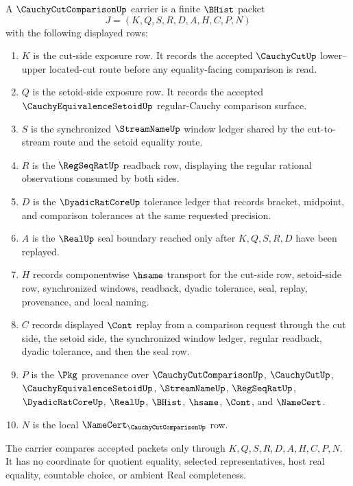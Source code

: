 \begin{definition}
\label{def:cauchy-cut-comparison-carrier}
A $\CauchyCutComparisonUp$ carrier is a finite $\BHist$ packet
$$
J=(K,Q,S,R,D,A,H,C,P,N)
$$
with the following displayed rows:
\begin{enumerate}
\item $K$ is the cut-side exposure row. It records the accepted $\CauchyCutUp$ lower--upper located-cut route before any equality-facing comparison is read.
\item $Q$ is the setoid-side exposure row. It records the accepted $\CauchyEquivalenceSetoidUp$ regular-Cauchy comparison surface.
\item $S$ is the synchronized $\StreamNameUp$ window ledger shared by the cut-to-stream route and the setoid equality route.
\item $R$ is the $\RegSeqRatUp$ readback row, displaying the regular rational observations consumed by both sides.
\item $D$ is the $\DyadicRatCoreUp$ tolerance ledger that records bracket, midpoint, and comparison tolerances at the same requested precision.
\item $A$ is the $\RealUp$ seal boundary reached only after $K,Q,S,R,D$ have been replayed.
\item $H$ records componentwise $\hsame$ transport for the cut-side row, setoid-side row, synchronized windows, readback, dyadic tolerance, seal, replay, provenance, and local naming.
\item $C$ records displayed $\Cont$ replay from a comparison request through the cut side, the setoid side, the synchronized window ledger, regular readback, dyadic tolerance, and then the seal row.
\item $P$ is the $\Pkg$ provenance over $\CauchyCutComparisonUp$, $\CauchyCutUp$, $\CauchyEquivalenceSetoidUp$, $\StreamNameUp$, $\RegSeqRatUp$, $\DyadicRatCoreUp$, $\RealUp$, $\BHist$, $\hsame$, $\Cont$, and $\NameCert$.
\item $N$ is the local $\NameCert_{\CauchyCutComparisonUp}$ row.
\end{enumerate}
The carrier compares accepted packets only through $K,Q,S,R,D,A,H,C,P,N$. It has no coordinate for quotient equality, selected representatives, host real equality, countable choice, or ambient Real completeness.
\end{definition}


